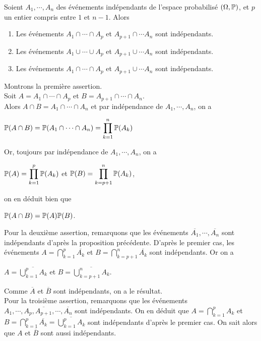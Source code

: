 \documentclass[12pt,a4paper]{report}
\begin{document}
\begin{proposition}{}{}
Soient $A_1,\cdots,A_n$ des événements indépendants de l'espace probabilisé $(\Omega,\mathbb{P})$, et $p$ un entier compris entre $1$ et $n-1$. Alors 
\begin{enumerate}
	\item Les événements $A_1 \cap \cdots \cap A_p$ et $A_{p+1}\cap \cdots A_n$ sont indépendants.
	\item Les événements $A_1 \cup \cdots \cup A_p$ et $A_{p+1}\cup \cdots A_n$ sont indépendants.
	\item Les événements $A_1 \cap \cdots \cap A_p$ et $A_{p+1}\cup \cdots A_n$ sont indépendants.
\end{enumerate}
\end{proposition}

\begin{demo}{}
Montrons la première assertion. \\
Soit $A = A_1 \cap \cdots \cap A_p$ et $B = A_{p+1} \cap \cdots \cap A_n$. \\

Alors $A \cap B = A_1 \cap \cdots \cap A_n$ et par indépendance de $A_1,\cdots,A_n$, on a 
\begin{center}
$\mathbb{P}(A \cap B) = \mathbb{P}(A_1 \cap \cdots \cap A_n) = \displaystyle \prod_{k=1}^n \mathbb{P}(A_k)$
\end{center}

Or, toujours par indépendance de $A_1,\cdots,A_n$, on a 
\begin{center}
$\mathbb{P}(A) = \displaystyle \prod_{k=1}^p \mathbb{P}(A_k)$ et $\mathbb{P}(B) = \displaystyle \prod_{k=p+1}^n \mathbb{P}(A_k)$,
\end{center}
on en déduit bien que
\begin{center}
$\mathbb{P}(A \cap B) = \mathbb{P}(A) \mathbb{P}(B)$.
\end{center}

Pour la deuxième assertion, remarquons que les événements $\overline{A_1}, \cdots, \overline{A_n}$ sont indépendants d'après la proposition précédente. D'après le premier cas, les événements $A = \displaystyle \bigcap_{k=1}^p \overline{A_k}$ et $B = \displaystyle \bigcap_{k=p+1}^n \overline{A_k}$ sont indépendants. Or on a 
\begin{center}
$A =\displaystyle \overline{\bigcup_{k=1}^p A_k}$ et $B = \displaystyle \overline{\bigcup_{k=p+1}^n A_k}$.
\end{center}

Comme $\overline{A}$ et $\overline{B}$ sont indépendants, on a le résultat. \\

Pour la troisième assertion, remarquons que les événements $A_1,\cdots,A_p, \overline{A_{p+1}}, \cdots, \overline{A_n}$ sont indépendants. On en déduit que $A = \bigcap_{k=1}^p A_k$ et $B = \bigcap_{k=1}^p \overline{A_k} = \overline{\bigcup_{k=1}^p A_k}$ sont indépendants d'après le premier cas. On sait alors que $A$ et $\overline{B}$ sont aussi indépendants. 

\end{demo}
\end{document}
